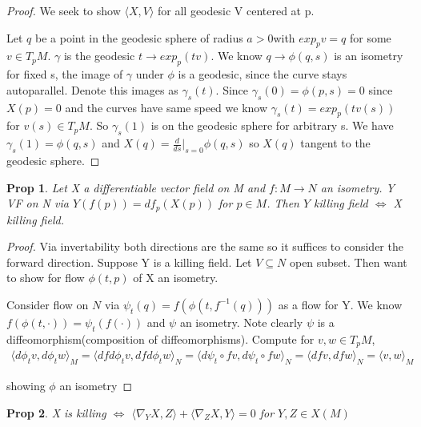 \documentclass[11pt]{article}
\newtheorem{prop}{Prop}
\begin{document}

\begin{proof}
	We seek to show $\langle X, V\rangle$ for all geodesic V centered at p. 

	Let $q$ be a point in the geodesic sphere of radius $a > 0$with $exp_p v = q$ for some $v \in T_pM$. $\gamma$ is the geodesic $t \to exp_p(tv)$. We know $q \to \phi(q,s)$ is an isometry for fixed s, the image of $\gamma$ under $\phi$ is a geodesic, since the curve stays autoparallel. %
	Denote this images as $\gamma_s(t)$. Since $\gamma_s(0) = \phi(p,s) = 0$ since $X(p) = 0$ and the curves have same speed we know $\gamma_s(t) = exp_p(tv(s))$ for $v(s) \in T_pM$. So $\gamma_s(1) $ is on the geodesic sphere for arbitrary s. We have $\gamma_s(1) = \phi(q,s)$ and $X(q) = \frac{d}{ds}|_{s=0}\phi(q,s)$ so $X(q)$ tangent to the geodesic sphere. 
\end{proof}

\begin{prop}
	Let X a differentiable vector field on M and $f : M \to N$ an isometry. Y VF on N via $Y(f(p)) = df_p (X(p))$ for $p \in M$. Then $Y$ killing field $\iff$ X killing field. 
\end{prop}

\begin{proof}
	Via invertability both directions are the same so it suffices to consider the forward direction. Suppose Y is a killing field. Let $V \subseteq N$ open subset. Then want to show for flow $\phi(t,p)$ of X an isometry. 

	Consider flow on $N$ via $\psi_t(q) = f(\phi(t,f^{-1}(q)))$ as a flow for Y. We know $f(\phi(t,\cdot)) = \psi_t(f(\cdot))$ and $\psi$ an isometry. Note clearly $\psi$ is a diffeomorphism(composition of diffeomorphisms). Compute for $v,w \in T_p M$,
	\begin{align*}
		\langle d\phi_t v,d\phi_t w\rangle_M = \langle df d\phi_t v,df d\phi_t w\rangle_N = \langle d \psi_t \circ f v,d \psi_t \circ f w\rangle_N = \langle d f v,d  f w\rangle_N = \langle v,w\rangle_M
	\end{align*} 

	showing $\phi$ an isometry
\end{proof}

\begin{prop}
	X is killing $\iff$ $\langle \nabla_Y X,Z\rangle + \langle \nabla_Z X,Y \rangle = 0$  for $Y,Z \in X(M)$
\end{prop}
\end{document}
